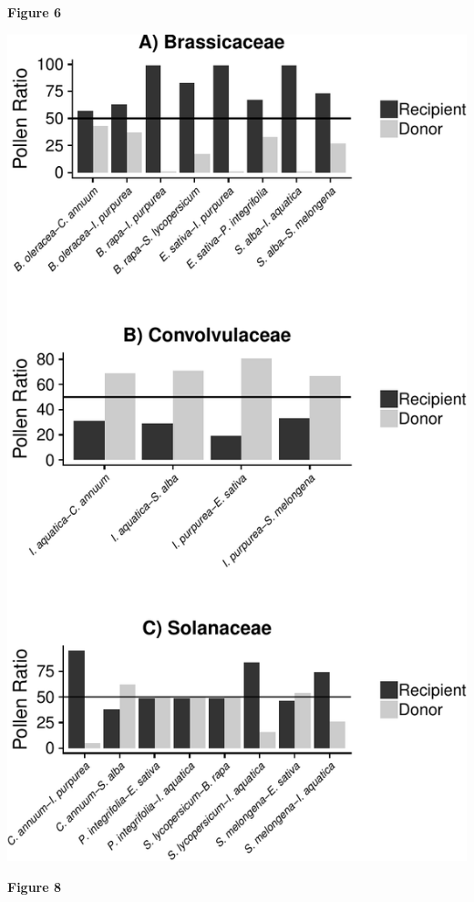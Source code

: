 \documentclass[]{article}
\begin{document}
\textbf{Figure 6}

\newpage

\begin{center}\includegraphics{output/figures/unnamed-chunk-9-1} \end{center}

\textbf{Figure 8}

\newpage
\end{document}
